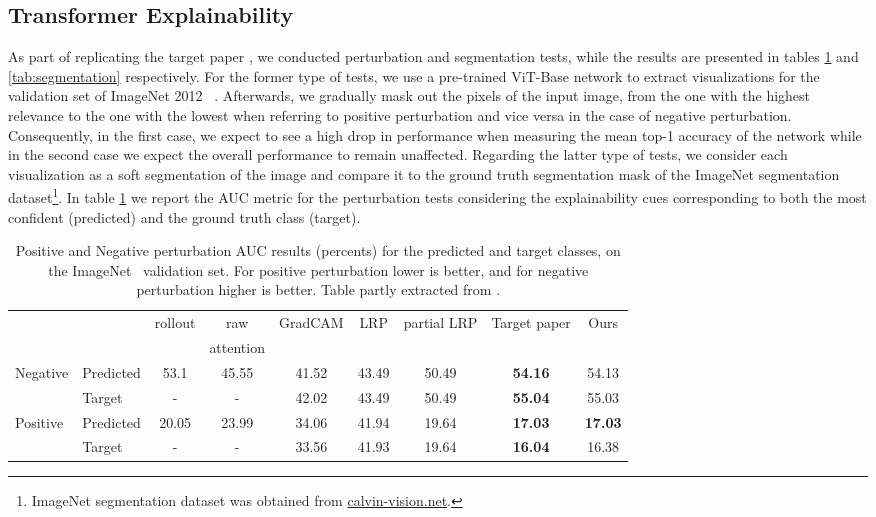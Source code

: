 \subsection{Transformer Explainability}
As part of replicating the target paper \cite{mainpaper}, we conducted perturbation and segmentation tests, while the results are presented in tables \ref{tab:perturbations} and \ref{tab:segmentation} respectively. For the former type of tests, we use a pre-trained ViT-Base network to extract visualizations for the validation set of ImageNet 2012 ~\cite{russakovsky2015ImageNet}. Afterwards, we gradually mask out the pixels of the input image, from the one with the highest relevance to the one with the lowest when referring to positive perturbation and vice versa in the case of negative perturbation. Consequently, in the first case, we expect to see a high drop in performance when measuring the mean top-1 accuracy of the network while in the second case we expect the overall performance to remain unaffected. Regarding the latter type of tests, we consider each visualization as a soft segmentation of the image and compare it to the ground truth segmentation mask of the ImageNet segmentation dataset\footnote{ImageNet segmentation dataset was obtained from \href{http://calvin-vision.net/bigstuff/proj-imagenet/data/gtsegs_ijcv.mat}{calvin-vision.net}.}.  In 
table \ref{tab:perturbations} we report the AUC metric for the perturbation tests considering the explainability cues corresponding to both the most confident (predicted) and the ground truth class (target).

\begin{table}[!h]
    \begin{tabular*}{\linewidth}{@{\extracolsep{\fill}}llccccccc}
        &&rollout & raw  & GradCAM & LRP & partial LRP & Target paper & Ours\\
        & &~\cite{samira2005} & attention &~\cite{selvaraju2017grad} &~\cite{binder2016layer} &~\cite{voita2019analyzing} &~\cite{mainpaper} & \\
       {Negative} &Predicted & 53.1 & 45.55 & 41.52 & 43.49 & 50.49 & \textbf{54.16} & 54.13\\
        &Target & - & - & 42.02 & 43.49 & 50.49 & \textbf{55.04} & 55.03 \\
        {Positive} &Predicted & 20.05 & 23.99 & 34.06 & 41.94 & 19.64 & \textbf{17.03} & \textbf{17.03}\\
        &Target & - & - & 33.56 & 41.93 & 19.64 & \textbf{16.04} & 16.38\\
    \end{tabular*}
    \caption{Positive and Negative perturbation AUC results (percents) for the predicted and target classes, on the ImageNet~\cite{russakovsky2015ImageNet} validation set. For positive perturbation lower is better, and for negative perturbation higher is better. Table partly extracted from \cite{mainpaper}.}
    \label{tab:perturbations}
\end{table}

